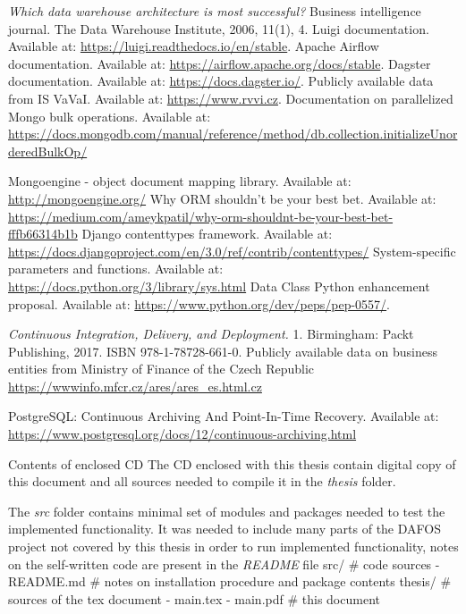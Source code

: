  {\it Which data warehouse architecture is most successful?} Business intelligence journal. The Data Warehouse Institute, 2006, 11(1), 4.
\bib [Luigi] Luigi documentation. Available at: \url{https://luigi.readthedocs.io/en/stable}.
\bib [Airflow] Apache Airflow documentation. Available at: \url{https://airflow.apache.org/docs/stable}.
\bib [Dagster] Dagster documentation. Available at: \url{https://docs.dagster.io/}.
\bib [VAVAI] Publicly available data from IS VaVaI.
Available at: \url{https://www.rvvi.cz}.
 Documentation on parallelized Mongo bulk operations. Available at: \url{https://docs.mongodb.com/manual/reference/method/db.collection.initializeUnorderedBulkOp/}

\bib[mongoengine] Mongoengine - object document mapping library. Available at: \url{http://mongoengine.org/}
 Why ORM shouldn’t be your best bet. Available at: \url{https://medium.com/ameykpatil/why-orm-shouldnt-be-your-best-bet-fffb66314b1b}
\bib [contenttypes] Django contenttypes framework. Available at: \url{https://docs.djangoproject.com/en/3.0/ref/contrib/contenttypes/}
\bib [path] System-specific parameters and functions. Available at: \url{https://docs.python.org/3/library/sys.html}
\bib [dataclass] Data Class Python enhancement proposal. Available at: \url{https://www.python.org/dev/peps/pep-0557/}.

 {\it  Continuous Integration, Delivery, and Deployment. } 1. Birmingham: Packt Publishing, 2017. ISBN 978-1-78728-661-0.
\bib [ARES]  Publicly available data on business entities from Ministry of Finance of the Czech Republic \url{https://wwwinfo.mfcr.cz/ares/ares_es.html.cz}

 PostgreSQL: Continuous Archiving And Point-In-Time Recovery. Available at: \url{https://www.postgresql.org/docs/12/continuous-archiving.html}

\app Contents of enclosed CD
The CD enclosed with this thesis contain digital copy of this document and all sources needed to compile it in the {\it thesis} folder.

The {\it src} folder contains minimal set of modules and packages needed to test the implemented functionality. It was needed to include many parts of the DAFOS project not covered by this thesis in order to run implemented functionality, notes on the self-written code are present in the {\it README} file 
\begtt
src/ # code sources
  - README.md # notes on installation procedure and package contents 
thesis/ # sources of the tex document
  - main.tex
  - main.pdf # this document
\endtt

\nextoddpage

\bye
